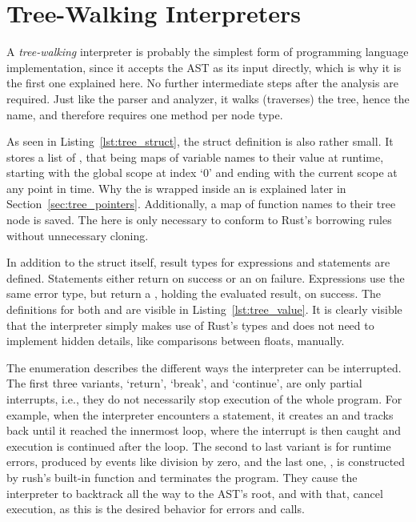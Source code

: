 \section{Tree-Walking Interpreters}
A \emph{tree-walking} interpreter is probably the simplest form of programming language implementation, since it accepts the AST as its input directly, which is why it is the first one explained here.
No further intermediate steps after the analysis are required.
Just like the parser and analyzer, it walks (traverses) the tree, hence the name, and therefore requires one method per node type.

As seen in Listing~\ref{lst:tree_struct}, the struct definition is also rather small.
It stores a list of , that being maps of variable names to their value at runtime, starting with the global scope at index `0' and ending with the current scope at any point in time.
Why the  is wrapped inside an  is explained later in Section~\ref{sec:tree_pointers}.
Additionally, a map of function names to their tree node is saved.
The  here is only necessary to conform to Rust's borrowing rules without unnecessary cloning.


In addition to the struct itself, result types for expressions and statements are defined.
Statements either return \qVerb{()} on success or an  on failure.
Expressions use the same error type, but return a , holding the evaluated result, on success.
The definitions for both  and  are visible in Listing~\ref{lst:tree_value}.
It is clearly visible that the interpreter simply makes use of Rust's types and does not need to implement hidden details, like comparisons between floats, manually.

The enumeration  describes the different ways the interpreter can be interrupted.
The first three variants, `return', `break', and `continue', are only partial interrupts, i.e., they do not necessarily stop execution of the whole program.
For example, when the interpreter encounters a  statement, it creates an  and tracks back until it reached the innermost loop, where the interrupt is then caught and execution is continued after the loop.
The second to last variant is for runtime errors, produced by events like division by zero, and the last one, , is constructed by rush's built-in  function and terminates the program.
They cause the interpreter to backtrack all the way to the AST's root, and with that, cancel execution, as this is the desired behavior for errors and  calls.

